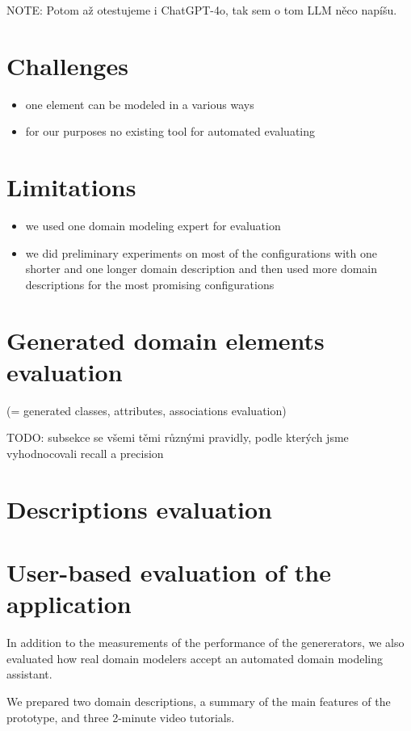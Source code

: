 NOTE: Potom až otestujeme i ChatGPT-4o, tak sem o tom LLM něco napíšu. \\


\section{Challenges}
\begin{itemize}
\item one element can be modeled in a various ways
\item for our purposes no existing tool for automated evaluating
\end{itemize}


\section{Limitations}
\begin{itemize}
\item we used one domain modeling expert for evaluation
\item we did preliminary experiments on most of the configurations with one shorter and one longer domain description and then used more domain descriptions for the most promising configurations
\end{itemize}


\section{Generated domain elements evaluation}
(= generated classes, attributes, associations evaluation)

TODO: subsekce se všemi těmi různými pravidly, podle kterých jsme vyhodnocovali recall a precision \\


\section{Descriptions evaluation}


\section{User-based evaluation of the application}

In addition to the measurements of the performance of the genererators, we also evaluated how real domain modelers accept an automated domain modeling assistant.

We prepared two domain descriptions, a summary of the main features of the prototype, and three 2-minute video tutorials.

